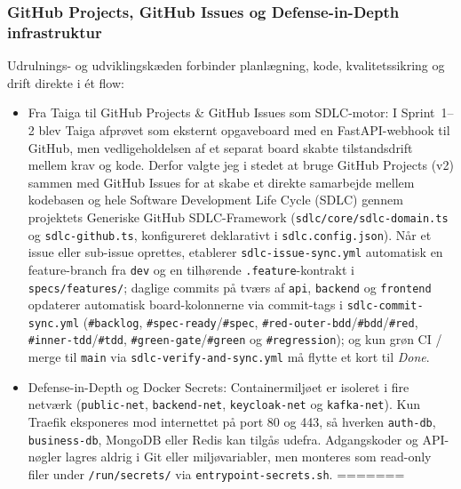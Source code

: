 \documentclass[11pt,a4paper]{article}
\begin{document}
\begin{table}[htbp]
\subsubsection{GitHub Projects, GitHub Issues og Defense-in-Depth infrastruktur}
Udrulnings- og udviklingskæden forbinder planlægning, kode, kvalitetssikring og drift direkte i ét flow:
\begin{itemize}[noitemsep]
<<<<<<< HEAD
    \item Fra Taiga til GitHub Projects \& GitHub Issues som SDLC-motor: I Sprint~1--2 blev Taiga afprøvet som eksternt opgaveboard med en FastAPI-webhook til GitHub, men vedligeholdelsen af et separat board skabte tilstandsdrift mellem krav og kode. Derfor valgte jeg i stedet at bruge GitHub Projects (v2) sammen med GitHub Issues for at skabe et direkte samarbejde mellem kodebasen og hele Software Development Life Cycle (SDLC) gennem projektets Generiske GitHub SDLC-Framework (\texttt{sdlc/core/sdlc-domain.ts} og \texttt{sdlc-github.ts}, konfigureret deklarativt i \texttt{sdlc.config.json}). Når et issue eller sub-issue oprettes, etablerer \texttt{sdlc-issue-sync.yml} automatisk en feature-branch fra \texttt{dev} og en tilhørende \texttt{.feature}-kontrakt i \texttt{specs/features/}; daglige commits på tværs af \texttt{api}, \texttt{backend} og \texttt{frontend} opdaterer automatisk board-kolonnerne via commit-tags i \texttt{sdlc-commit-sync.yml} (\texttt{\#backlog}, \texttt{\#spec-ready}/\texttt{\#spec}, \texttt{\#red-outer-bdd}/\texttt{\#bdd}/\texttt{\#red}, \texttt{\#inner-tdd}/\texttt{\#tdd}, \texttt{\#green-gate}/\texttt{\#green} og \texttt{\#regression}); og kun grøn CI / merge til \texttt{main} via \texttt{sdlc-verify-and-sync.yml} må flytte et kort til \textit{Done}.
    \item Defense-in-Depth og Docker Secrets: Containermiljøet er isoleret i fire netværk (\texttt{public-net}, \texttt{backend-net}, \texttt{keycloak-net} og \texttt{kafka-net}). Kun Traefik eksponeres mod internettet på port 80 og 443, så hverken \texttt{auth-db}, \texttt{business-db}, MongoDB eller Redis kan tilgås udefra. Adgangskoder og API-nøgler lagres aldrig i Git eller miljøvariabler, men monteres som read-only filer under \texttt{/run/secrets/} via \texttt{entrypoint-secrets.sh}.
=======

\end{itemize}
\end{table}
\end{document}
